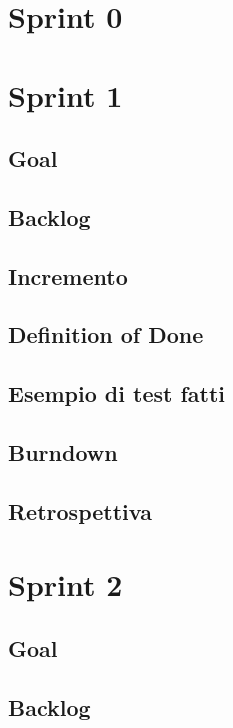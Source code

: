 \documentclass{article}
\begin{document}
\section{Sprint 0}

\section{Sprint 1}

\subsection{Goal}

\subsection{Backlog}

\subsection{Incremento}

\subsection{Definition of Done}

\subsection{Esempio di test fatti}

\subsection{Burndown}

\subsection{Retrospettiva}

\section{Sprint 2}

\subsection{Goal}

\subsection{Backlog}
\end{document}

